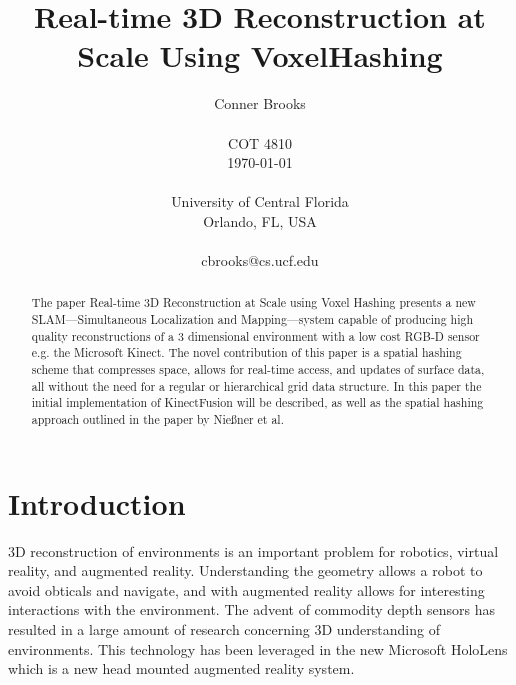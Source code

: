 \documentclass[10pt, twocolumn]{article}
\begin{document}
\title{Real-time 3D Reconstruction at Scale Using VoxelHashing}

\author{Conner Brooks\\
\\
COT 4810\\
\today \\
\\
University of Central Florida\\
Orlando, FL, USA\\
\\
cbrooks@cs.ucf.edu\\
}

\maketitle
\thispagestyle{empty}


\begin{abstract}
The paper Real-time 3D Reconstruction at Scale using Voxel Hashing
\cite{niessner2013hashing} presents a new SLAM---Simultaneous Localization and
Mapping---system capable of producing high quality
reconstructions of a 3 dimensional environment with a low cost RGB-D sensor e.g.
the Microsoft Kinect. 
The novel contribution of this paper is a spatial hashing scheme that compresses space, allows for real-time access, and updates of surface data, all without the need for a regular or hierarchical grid data structure.
In this paper the initial implementation of KinectFusion \cite{izadi11}
\cite{newcombe11} will be described, as well as the spatial hashing approach
outlined in the paper by Nie{\ss}ner et al.
  
\end{abstract}



\section{Introduction}
3D reconstruction of environments is an important problem for robotics, virtual
reality, and augmented reality. Understanding the geometry allows a robot to
avoid obticals and navigate, and with augmented reality allows for interesting
interactions with the environment. The advent of commodity depth sensors has
resulted in a large amount of research concerning 3D understanding of
environments. This technology has been leveraged in the new Microsoft HoloLens \cite{hololens} which is a new head mounted augmented reality system.
\end{document}
